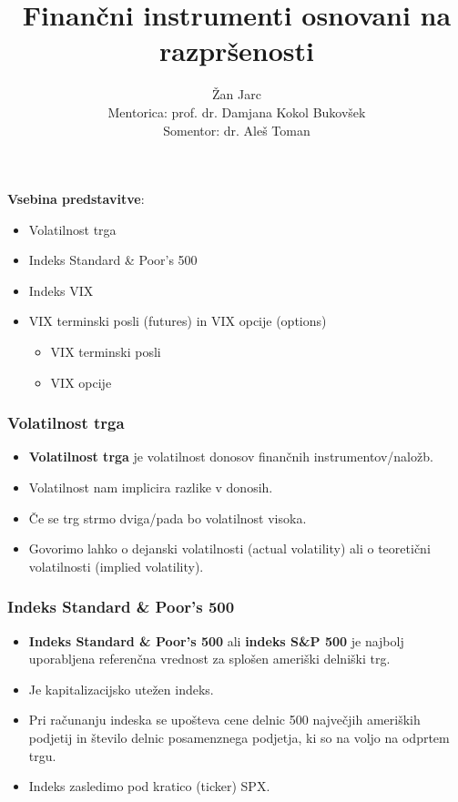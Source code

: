 \documentclass[10pt]{beamer}
\begin{document}
\title[Finančni instrumenti osnovani na razpršenosti]{Finančni instrumenti osnovani na razpršenosti}
\author{Žan Jarc\\ Mentorica: prof. dr. Damjana Kokol Bukovšek\\ Somentor: dr. Aleš Toman}

\begin{frame}
	\titlepage
\end {frame}

\begin{frame}
\textbf{Vsebina predstavitve}:
	\begin{itemize}
		\item Volatilnost trga
		\item Indeks Standard \& Poor’s 500 
		\item Indeks VIX
		\item VIX terminski posli (futures) in VIX opcije (options)
			\begin{itemize}
				\item VIX terminski posli
				\item VIX opcije
			\end{itemize}
	\end{itemize}
\end {frame}

\begin{frame}
\frametitle{Volatilnost trga}
\begin{itemize}
\item \textbf{Volatilnost trga} je volatilnost donosov finančnih instrumentov/naložb.

\item Volatilnost nam implicira razlike v donosih.

\item Če se trg strmo dviga/pada bo volatilnost visoka.
\item Govorimo lahko o dejanski volatilnosti (actual volatility) ali o teoretični volatilnosti (implied volatility).
\end{itemize}
\end{frame}

\begin{frame}
\frametitle{Indeks Standard \& Poor’s 500}
\begin{itemize}
\item \textbf{Indeks Standard \& Poor’s 500} ali \textbf{indeks S\&P 500} je najbolj uporabljena referenčna vrednost za splošen ameriški delniški trg.
\item Je kapitalizacijsko utežen indeks. 
\item Pri računanju indeska se upošteva cene delnic 500 največjih ameriških podjetij in število delnic posamenznega podjetja, ki so na voljo na odprtem trgu.
\item Indeks zasledimo pod kratico (ticker) SPX.

\end{itemize}
\end{frame}
\end{document}
